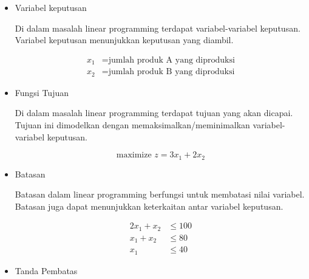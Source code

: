\begin{itemize}
	\item Variabel keputusan
	
		Di dalam masalah linear programming terdapat variabel-variabel keputusan. Variabel keputusan menunjukkan keputusan yang diambil.
		
		\begin{equation*}
			\begin{split}
				x_1 &= \text{jumlah produk A yang diproduksi} \\
    			x_2 &= \text{jumlah produk B yang diproduksi}
			\end{split}
		\end{equation*}
		
	\item Fungsi Tujuan
	
		Di dalam masalah linear programming terdapat tujuan yang akan dicapai. Tujuan ini dimodelkan dengan memaksimalkan/meminimalkan variabel-variabel keputusan.
		
		\begin{equation*}
			\text{maximize } z = 3x_1 + 2x_2
		\end{equation*}

	\item Batasan
	
		Batasan dalam linear programming berfungsi untuk membatasi nilai variabel. Batasan juga dapat menunjukkan keterkaitan antar variabel keputusan.
		
		\begin{equation*}
			\begin{split}
				2x_1 + x_2 &\leq 100 \\
    			x_1 + x_2 &\leq 80 \\
    			x_1 &\leq 40
			\end{split}
		\end{equation*}
		
	\item Tanda Pembatas
		

\end{itemize}

